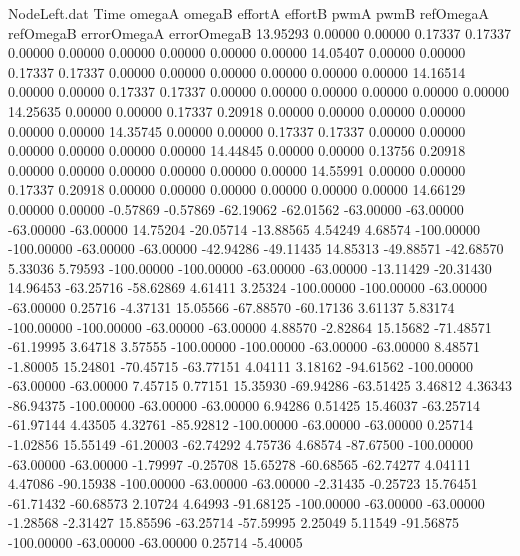 \begin{filecontents}{NodeLeft.dat}
Time omegaA omegaB effortA effortB pwmA pwmB refOmegaA refOmegaB errorOmegaA errorOmegaB
  13.95293    0.00000    0.00000     0.17337    0.17337    0.00000    0.00000    0.00000    0.00000    0.00000    0.00000
  14.05407    0.00000    0.00000     0.17337    0.17337    0.00000    0.00000    0.00000    0.00000    0.00000    0.00000
  14.16514    0.00000    0.00000     0.17337    0.17337    0.00000    0.00000    0.00000    0.00000    0.00000    0.00000
  14.25635    0.00000    0.00000     0.17337    0.20918    0.00000    0.00000    0.00000    0.00000    0.00000    0.00000
  14.35745    0.00000    0.00000     0.17337    0.17337    0.00000    0.00000    0.00000    0.00000    0.00000    0.00000
  14.44845    0.00000    0.00000     0.13756    0.20918    0.00000    0.00000    0.00000    0.00000    0.00000    0.00000
  14.55991    0.00000    0.00000     0.17337    0.20918    0.00000    0.00000    0.00000    0.00000    0.00000    0.00000
  14.66129    0.00000    0.00000    -0.57869   -0.57869  -62.19062  -62.01562  -63.00000  -63.00000  -63.00000  -63.00000
  14.75204  -20.05714  -13.88565     4.54249    4.68574 -100.00000 -100.00000  -63.00000  -63.00000  -42.94286  -49.11435
  14.85313  -49.88571  -42.68570     5.33036    5.79593 -100.00000 -100.00000  -63.00000  -63.00000  -13.11429  -20.31430
  14.96453  -63.25716  -58.62869     4.61411    3.25324 -100.00000 -100.00000  -63.00000  -63.00000    0.25716   -4.37131
  15.05566  -67.88570  -60.17136     3.61137    5.83174 -100.00000 -100.00000  -63.00000  -63.00000    4.88570   -2.82864
  15.15682  -71.48571  -61.19995     3.64718    3.57555 -100.00000 -100.00000  -63.00000  -63.00000    8.48571   -1.80005
  15.24801  -70.45715  -63.77151     4.04111    3.18162  -94.61562 -100.00000  -63.00000  -63.00000    7.45715    0.77151
  15.35930  -69.94286  -63.51425     3.46812    4.36343  -86.94375 -100.00000  -63.00000  -63.00000    6.94286    0.51425
  15.46037  -63.25714  -61.97144     4.43505    4.32761  -85.92812 -100.00000  -63.00000  -63.00000    0.25714   -1.02856
  15.55149  -61.20003  -62.74292     4.75736    4.68574  -87.67500 -100.00000  -63.00000  -63.00000   -1.79997   -0.25708
  15.65278  -60.68565  -62.74277     4.04111    4.47086  -90.15938 -100.00000  -63.00000  -63.00000   -2.31435   -0.25723
  15.76451  -61.71432  -60.68573     2.10724    4.64993  -91.68125 -100.00000  -63.00000  -63.00000   -1.28568   -2.31427
  15.85596  -63.25714  -57.59995     2.25049    5.11549  -91.56875 -100.00000  -63.00000  -63.00000    0.25714   -5.40005

\end{filecontents}
